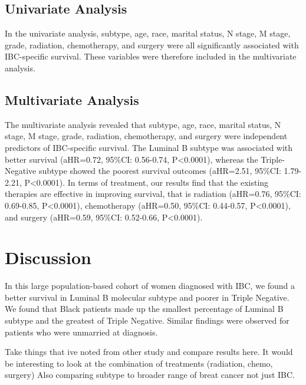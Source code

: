 \documentclass[
  letterpaper,
  DIV=11,
  numbers=noendperiod]{scrartcl}
\begin{document}
\subsection{Univariate Analysis}\label{univariate-analysis}

In the univariate analysis, subtype, age, race, marital status, N stage,
M stage, grade, radiation, chemotherapy, and surgery were all
significantly associated with IBC-specific survival. These variables
were therefore included in the multivariate analysis.

\subsection{Multivariate Analysis}\label{multivariate-analysis}

The multivariate analysis revealed that subtype, age, race, marital
status, N stage, M stage, grade, radiation, chemotherapy, and surgery
were independent predictors of IBC-specific survival. The Luminal B
subtype was associated with better survival (aHR=0.72, 95\%CI:
0.56-0.74, P\textless0.0001), whereas the Triple-Negative subtype showed
the poorest survival outcomes (aHR=2.51, 95\%CI: 1.79-2.21,
P\textless0.0001). In terms of treatment, our results find that the
existing therapies are effective in improving survival, that is
radiation (aHR=0.76, 95\%CI: 0.69-0.85, P\textless0.0001), chemotherapy
(aHR=0.50, 95\%CI: 0.44-0.57, P\textless0.0001), and surgery (aHR=0.59,
95\%CI: 0.52-0.66, P\textless0.0001).

\clearpage

\section{Discussion}\label{discussion}

In this large population-based cohort of women diagnosed with IBC, we
found a better survival in Luminal B molecular subtype and poorer in
Triple Negative. We found that Black patients made up the smallest
percentage of Luminal B subtype and the greatest of Triple Negative.
Similar findings were observed for patients who were unmarried at
diagnosis.

Take things that ive noted from other study and compare results here. It
would be interesting to look at the combination of treatments
(radiation, chemo, surgery) Also comparing subtype to broader range of
breat cancer not just IBC.
\end{document}

